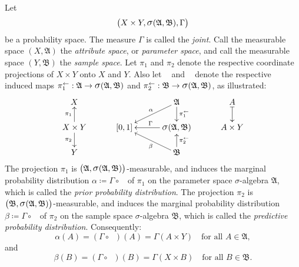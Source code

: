 \documentclass[
twoside=true,
paper=letter,
fontsize=9pt,
pagesize=auto,
leqno,
openany,
headsepline,
overfullrule,
]{scrbook}
\theoremstyle{plain}
\theoremstyle{plain}
\theoremstyle{definition}
\theoremstyle{bfnoteitalic}
\theoremstyle{bfnoteroman}
\newcommand{\sigalg}[1]{\mathfrak{#1}}
\newcommand{\definedby}{\coloneqq}
\newcommand{\sagb}{\mathop{\hbox{\large{$\sigma$}}}\nolimits}
\newcommand{\textsigma}{\hbox{\large{$\sigma$}}\kern-1pt}
\newcommand{\preimage}[1]{\mathop{#1^{\leftarrow}}}
\newcommand{\productsig}[2]{\sagb(#1,#2)}
\newcommand{\measurespace}{X}
\newcommand{\measurespaceii}{Y}
\newcommand{\seti}{A}
\newcommand{\projectionone}{\pi_1}
\newcommand{\projectiontwo}{\pi_2}
\newcommand{\pspace}{\measurespace}%
\newcommand{\sspace}{\measurespaceii}%
\newcommand{\pspaceset}{A}
\newcommand{\sspaceset}{B}
\newcommand{\sspacesig}{\sigalg{B}}
\newcommand{\pspacesig}{\sigalg{A}}
\newcommand{\measonprod}{\Gamma}%
\newcommand{\marginalone}{\alpha}%
\newcommand{\marginaltwo}{\beta}%
\newcommand{\prior}{\marginalone}
\newcommand{\predictive}{\marginaltwo}
\begin{document}
Let
\[
\bigl(\pspace\times\sspace,
\productsig{\pspacesig}{\sspacesig}, 
\measonprod\bigr)
\]
be a probability space.
The measure $\measonprod$ is called the \emph{joint}.
Call the measurable space $(\pspace, \pspacesig)$ the \emph{attribute space}, or \emph{parameter space}, and call the measurable space
$(\sspace, \sspacesig)$ the 
\emph{sample space}.
Let $\projectionone$ and $\projectiontwo$ denote the respective coordinate projections of 
$\pspace\times\sspace$ onto $\pspace$ and $\sspace$. Also let $\preimage{\projectionone}$ and 
$\preimage{\projectiontwo}$ denote the respective induced maps 
$\preimage{\projectionone}:\pspacesig\to\productsig{\pspacesig}{\sspacesig}$
and 
$\preimage{\projectiontwo}:\sspacesig\to\productsig{\pspacesig}{\sspacesig}$, as illustrated:
\[
\xymatrix@R=16pt@C=30pt{ 
\pspace
&
&
\pspacesig 
\ar[d]^-{\preimage{\projectionone}}
\ar[dl]_-{\marginalone}
& \seti \ar@{|->}[d]
\\
\pspace\times\sspace \ar[u]^-{\projectionone} \ar[d]_-{\projectiontwo} &
[0,1] &
\productsig{\pspacesig}{\sspacesig}  \ar[l]_\measonprod
& \seti\times\sspace
\\
\sspace 
&
&
\sspacesig
\ar[u]_-{\preimage{\projectiontwo}}
\ar[ul]^-{\marginaltwo}
\\
}
\]
The projection $\projectionone$ 
is $\bigl(\pspacesig,\productsig{\pspacesig}{\sspacesig}\bigr)$\hyp{}measurable, and
induces the marginal probability distribution
$\marginalone\definedby\measonprod\circ\preimage{\projectionone}$ of $\projectionone$ on the parameter space
\textsigma-algebra $\pspacesig$, 
which is called the \emph{prior probability distribution}.
The projection $\projectiontwo$ 
is $\bigl(\sspacesig,\productsig{\pspacesig}{\sspacesig}\bigr)$\hyp{}measurable, and 
induces the marginal probability distribution
$\marginaltwo\definedby\measonprod\circ\preimage{\projectiontwo}$ of $\projectiontwo$ on the sample space
\textsigma-algebra $\sspacesig$, 
which is called the \emph{predictive probability distribution}.
Consequently:
\[
\prior(\pspaceset) 
= ( \measonprod\circ\preimage{\projectionone} ) (\pspaceset)
= \measonprod(\pspaceset\times\sspace)
\quad \text{for all $\pspaceset\in\pspacesig$},
\]
and
\[
\predictive(\sspaceset) 
= ( \measonprod\circ\preimage{\projectiontwo} ) (\sspaceset)
= \measonprod(\pspace\times\sspaceset)
\quad \text{for all $\sspaceset\in\sspacesig$}.
\]
\end{document}
